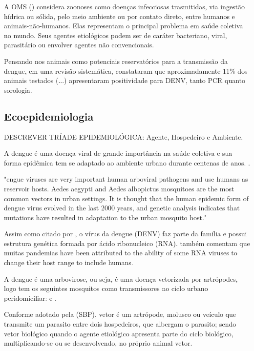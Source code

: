 \indent A \acrshort{OMS} (\citeyear{WHO2020Zoonoses}) considera zoonoses como doenças infecciosas trasmitidas, via ingestão hídrica ou sólida, pelo meio ambiente ou por contato direto, entre humanos e animais-não-humanos. Elas representam o principal problema em saúde coletiva no mundo. Seus agentes etiológicos podem ser de caráter bacteriano, viral, parasitário ou envolver agentes não convencionais.

\indent Pensando nos animais como potenciais reservatórios para a transmissão da dengue,  em uma revisão sistemática, constataram que aproximadamente 11\% dos animais testados (...) apresentaram positividade para DENV, tanto PCR quanto sorologia.


\subsection{Ecoepidemiologia}

\indent DESCREVER TRÍADE EPIDEMIOLÓGICA: Agente, Hospedeiro e Ambiente.

\indent A dengue é uma doença viral de grande importância na saúde coletiva e sua forma epidêmica tem se adaptado ao ambiente urbano durante centenas de anos. \cite{ArboviralTransmission}.

 "engue viruses are very important human arboviral pathogens and use humans as reservoir hosts. Aedes aegypti and Aedes albopictus mosquitoes are the most common vectors in urban settings. It is thought that the human epidemic form of dengue virus evolved in the last 2000 years, and genetic analysis indicates that mutations have resulted in adaptation to the urban mosquito host."

\indent Assim como citado por , o vírus da dengue (\acrfull{DENV}) faz parte da família  e possui estrutura genética formada por ácido ribonucleico (\acrfull{RNA}).  também comentam que muitas pandemias have been attributed to the ability of some RNA viruses to change their host range to include humans. 

\indent A dengue é uma arbovirose, ou seja, é uma doença vetorizada por artrópodes, logo tem os seguintes mosquitos como transmissores no ciclo urbano peridomiciliar:  e  \cite{ArboviralTransmission}.

\indent Conforme adotado pela  (\acrshort{SBP}), vetor é um artrópode, molusco ou veículo que transmite um parasito entre dois hospedeiros, que albergam o parasito; sendo vetor biológico quando o agente etiológico apresenta parte do ciclo biológico, multiplicando-se ou se desenvolvendo, no próprio animal vetor.

